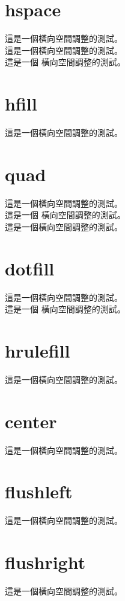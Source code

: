 \documentclass{article}
\begin{document}
\begin{CJK}{UTF8}{bsmi}
\section{hspace}
\hspace*{2em}這是一個橫向空間調整的測試。\\
這是一個\hspace{2em}橫向空間調整的測試。\\
這是一個 \hspace{2em} 橫向空間調整的測試。
\section{hfill}
這是一個\hfill{}橫向空間調整的測試。
\section{quad}
這是一個\quad{}橫向空間調整的測試。\\
這是一個 \quad{} 橫向空間調整的測試。\\
這是一個\qquad{}橫向空間調整的測試。
\section{dotfill}
這是一個\dotfill{}橫向空間調整的測試。\\
這是一個 \dotfill{} 橫向空間調整的測試。
\section{hrulefill}
這是一個\hrulefill{}橫向空間調整的測試。
\section{center}
\begin{center}
這是一個橫向空間調整的測試。
\end{center}
\section{flushleft}
\begin{flushleft}
這是一個橫向空間調整的測試。
\end{flushleft}
\section{flushright}
\begin{flushright}
這是一個橫向空間調整的測試。
\end{flushright}

\end{CJK}
\end{document}
